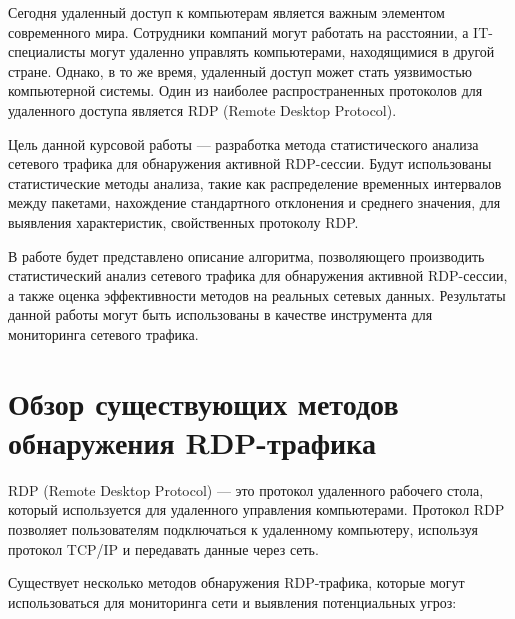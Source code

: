 \documentclass[bachelor, och, coursework]{SCWorks}
\begin{document}


\tableofcontents

\intro
Сегодня удаленный доступ к компьютерам является важным элементом современного мира. Сотрудники компаний могут работать на расстоянии, а 
IT-специалисты могут удаленно управлять компьютерами, находящимися в другой стране. Однако, в то же время, удаленный доступ может стать 
уязвимостью компьютерной системы. Один из наиболее распространенных протоколов для удаленного доступа является RDP (Remote Desktop Protocol). 

Цель данной курсовой работы --- разработка метода статистического анализа сетевого трафика для обнаружения активной RDP-сессии. 
Будут использованы статистические методы анализа, такие как распределение временных интервалов между пакетами, нахождение стандартного отклонения и 
среднего значения, для выявления характеристик, свойственных протоколу RDP.

В работе будет представлено описание алгоритма, позволяющего производить статистический анализ сетевого трафика для обнаружения активной 
RDP-сессии, а также оценка эффективности методов на реальных сетевых данных. 
Результаты данной работы могут быть использованы в качестве инструмента для мониторинга сетевого трафика.

\section{Обзор существующих методов обнаружения RDP-трафика}

RDP (Remote Desktop Protocol) --- это протокол удаленного рабочего стола, который используется для удаленного управления компьютерами. 
Протокол RDP позволяет пользователям подключаться к удаленному компьютеру, используя протокол TCP/IP и передавать данные через сеть.

Существует несколько методов обнаружения RDP-трафика, которые могут использоваться для мониторинга сети и выявления потенциальных угроз:
\end{document}
